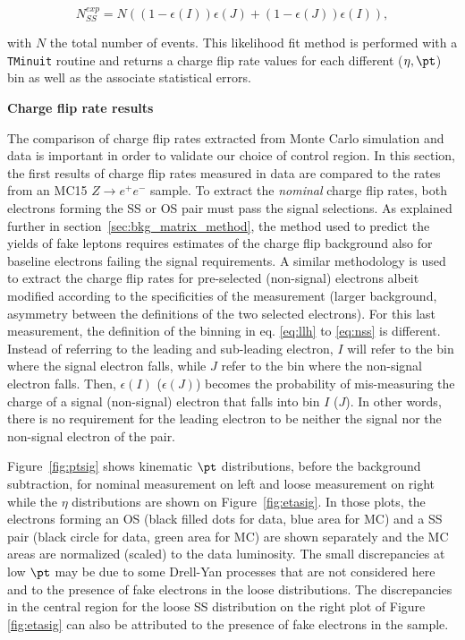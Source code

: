 \begin{equation}
\label{eq:nss}
N_{SS}^{exp} = N ( (1-\epsilon(I))\epsilon(J) + (1-\epsilon(J))\epsilon(I) ),
\end{equation}

with $N$ the total number of events. 
This likelihood fit method is performed with a {\tt TMinuit} routine 
and returns a charge flip rate values for each different ($\eta,\pt$) bin 
as well as the associate statistical errors.

\par{\bf Charge flip rate results}

The comparison of charge flip rates extracted from Monte Carlo simulation and data is important in order to validate our choice of control region. 
In this section, the first results of charge flip rates measured in data are compared to the rates from an MC15 $Z\to e^+e^-$ sample.
To extract the \textit{nominal} charge flip rates, both electrons forming the SS or OS pair must pass the signal selections. 
As explained further in section~\ref{sec:bkg_matrix_method}, the method used to predict the yields of fake leptons requires estimates of the charge flip background 
also for baseline electrons failing the signal requirements. 
A similar methodology is used to extract the charge flip rates for pre-selected (non-signal) electrons 
albeit modified according to the specificities of the measurement (larger background, asymmetry between the definitions of the two selected electrons). 
For this last measurement, the definition of the binning in eq. \ref{eq:llh} to \ref{eq:nss} is different. Instead of referring to the leading and sub-leading electron, $I$ will refer to the bin where the signal electron falls, while $J$ refer to the bin where the non-signal electron falls. Then, $\epsilon(I)$ ($\epsilon (J)$) becomes the probability of mis-measuring the charge of a signal (non-signal) electron that falls into bin $I$ ($J$). In other words, there is no requirement for the leading electron to be neither the signal nor the non-signal electron of the pair.

Figure~\ref{fig:ptsig} shows kinematic $\pt$ distributions, before the background subtraction, 
for nominal measurement on left and loose measurement on right while the $\eta$ distributions are shown on Figure~\ref{fig:etasig}. 
In those plots, the electrons forming an OS (black filled dots for data, blue area for MC) and a SS pair (black circle for data, green area for MC) 
are shown separately and the MC areas are normalized (scaled) to the data luminosity.
The small discrepancies at low $\pt$ may be due to some Drell-Yan processes that are not considered here 
and to the presence of fake electrons in the loose distributions. The discrepancies in the central region for the loose SS distribution on the right plot of Figure \ref{fig:etasig} can also be attributed to the presence of fake electrons in the sample. 


